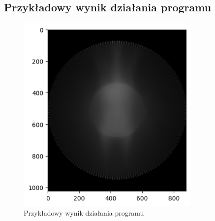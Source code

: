\documentclass[11pt,a4paper]{article}
\begin{document}
    \subsection{Przykładowy wynik działania programu}
    \begin{figure}[H]
        \centering
        \includegraphics[width=0.8\textwidth]{inputoutput1}
        \caption{Przykładowy wynik działania programu}
    \end{figure}
\end{document}
